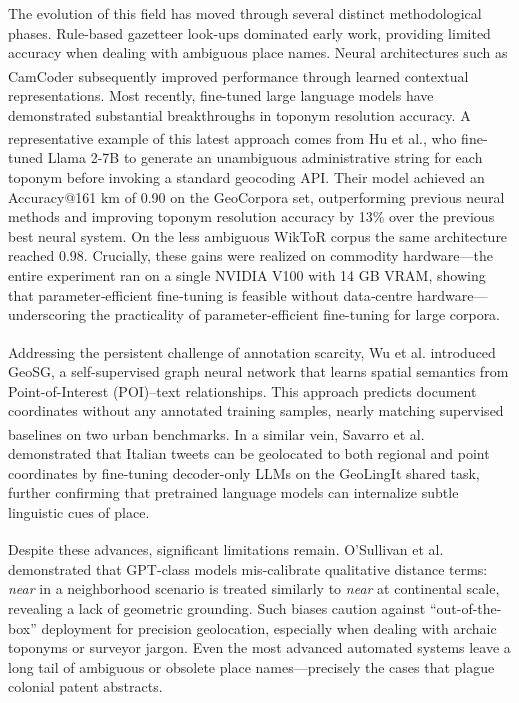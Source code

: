\documentclass[
  10pt]{article}
\begin{document}
The evolution of this field has moved through several distinct
methodological phases. Rule-based gazetteer look-ups dominated early
work, providing limited accuracy when dealing with ambiguous place
names. Neural architectures such as
CamCoder\textsuperscript{}
subsequently improved performance through learned contextual
representations. Most recently, fine-tuned large language models have
demonstrated substantial breakthroughs in toponym resolution accuracy. A
representative example of this latest approach comes from Hu et
al.\textsuperscript{}, who
fine-tuned Llama 2-7B to generate an unambiguous administrative string
for each toponym before invoking a standard geocoding API. Their model
achieved an Accuracy@161 km of 0.90 on the GeoCorpora set, outperforming
previous neural methods and improving toponym resolution accuracy by
13\% over the previous best neural system. On the less ambiguous WikToR
corpus the same architecture reached 0.98. Crucially, these gains were
realized on commodity hardware---the entire experiment ran on a single
NVIDIA V100 with 14 GB VRAM, showing that parameter‑efficient
fine‑tuning is feasible without data‑centre hardware---underscoring the
practicality of parameter-efficient fine-tuning for large corpora.

Addressing the persistent challenge of annotation scarcity, Wu et
al.\textsuperscript{} introduced GeoSG, a
self-supervised graph neural network that learns spatial semantics from
Point-of-Interest (POI)--text relationships. This approach predicts
document coordinates without any annotated training samples, nearly
matching supervised baselines on two urban benchmarks. In a similar
vein, Savarro et
al.\textsuperscript{}
demonstrated that Italian tweets can be geolocated to both regional and
point coordinates by fine-tuning decoder-only LLMs on the GeoLingIt
shared task, further confirming that pretrained language models can
internalize subtle linguistic cues of place.

Despite these advances, significant limitations remain. O'Sullivan et
al.\textsuperscript{}
demonstrated that GPT-class models mis-calibrate qualitative distance
terms: \emph{near} in a neighborhood scenario is treated similarly to
\emph{near} at continental scale, revealing a lack of geometric
grounding. Such biases caution against ``out-of-the-box'' deployment for
precision geolocation, especially when dealing with archaic toponyms or
surveyor jargon. Even the most advanced automated systems leave a long
tail of ambiguous or obsolete place names---precisely the cases that
plague colonial patent abstracts.
\end{document}

